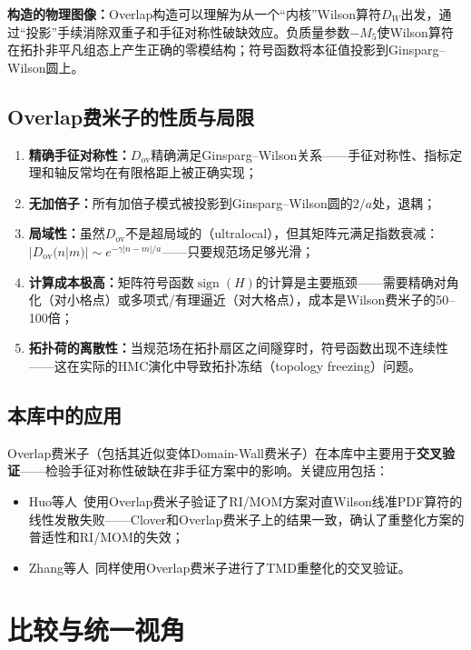 \documentclass[12pt,a4paper]{ctexart}
\theoremstyle{definition}
\begin{document}
\textbf{构造的物理图像：}Overlap构造可以理解为从一个``内核''Wilson算符$D_W$出发，通过``投影''手续消除双重子和手征对称性破缺效应。负质量参数$-M_5$使Wilson算符在拓扑非平凡组态上产生正确的零模结构；符号函数将本征值投影到Ginsparg--Wilson圆上。

\subsection{Overlap费米子的性质与局限}

\begin{enumerate}[leftmargin=*]
    \item \textbf{精确手征对称性：}$D_{\text{ov}}$精确满足Ginsparg--Wilson关系——手征对称性、指标定理和轴反常均在有限格距上被正确实现；
    \item \textbf{无加倍子：}所有加倍子模式被投影到Ginsparg--Wilson圆的$2/a$处，退耦；
    \item \textbf{局域性：}虽然$D_{\text{ov}}$不是超局域的（ultralocal），但其矩阵元满足指数衰减：$|D_{\text{ov}}(n|m)| \sim e^{-\gamma|n-m|/a}$——只要规范场足够光滑；
    \item \textbf{计算成本极高：}矩阵符号函数$\operatorname{sign}(H)$的计算是主要瓶颈——需要精确对角化（对小格点）或多项式/有理逼近（对大格点），成本是Wilson费米子的50--100倍；
    \item \textbf{拓扑荷的离散性：}当规范场在拓扑扇区之间隧穿时，符号函数出现不连续性——这在实际的HMC演化中导致拓扑冻结（topology freezing）问题。
\end{enumerate}

\subsection{本库中的应用}

Overlap费米子（包括其近似变体Domain-Wall费米子）在本库中主要用于\textbf{交叉验证}——检验手征对称性破缺在非手征方案中的影响。关键应用包括：
\begin{itemize}
    \item Huo等人~\cite{Huo2021self}使用Overlap费米子验证了RI/MOM方案对直Wilson线准PDF算符的线性发散失败——Clover和Overlap费米子上的结果一致，确认了重整化方案的普适性和RI/MOM的失效；
    \item Zhang等人~\cite{Zhang2022renormTMD}同样使用Overlap费米子进行了TMD重整化的交叉验证。
\end{itemize}

\section{比较与统一视角}
\end{document}
